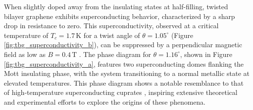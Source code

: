 When slightly doped away from the insulating states at half-filling, twisted bilayer graphene exhibits superconducting behavior, characterized by a sharp drop in resistance to zero. This superconductivity, observed at a critical temperature of \( T_c = 1.7 \, \text{K} \) for a twist angle of \( \theta = 1.05^\circ \) (Figure \ref{fig:tbg_superconductivity_b}), can be suppressed by a perpendicular magnetic field as low as \( B = 0.4 \, \text{T} \) \cite{cao2018}. The phase diagram for \( \theta = 1.16^\circ \), shown in Figure \ref{fig:tbg_superconductivity_a}, features two superconducting domes flanking the Mott insulating phase, with the system transitioning to a normal metallic state at elevated temperatures. This phase diagram shows a notable resemblance to that of high-temperature superconducting cuprates \cite{cuprate_superconductivity_lee2006}, inspiring extensive theoretical and experimental efforts to explore the origins of these phenomena.

